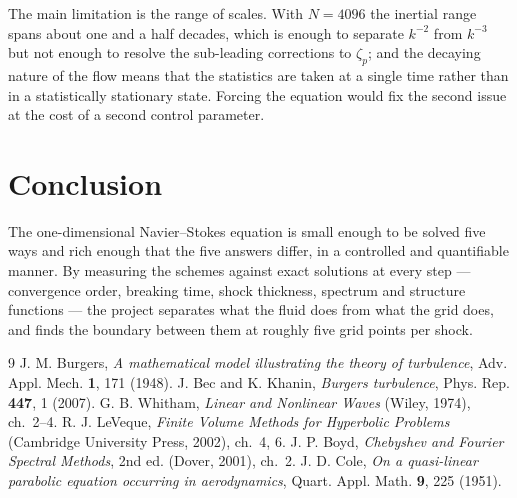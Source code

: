 \documentclass[10pt,a4paper]{article}
\begin{document}
The main limitation is the range of scales. With $N=4096$ the inertial range
spans about one and a half decades, which is enough to separate $k^{-2}$ from
$k^{-3}$ but not enough to resolve the sub-leading corrections to
$\zeta_p$; and the decaying nature of the flow means that the statistics are
taken at a single time rather than in a statistically stationary state. Forcing
the equation would fix the second issue at the cost of a second control
parameter.

\section{Conclusion}

The one-dimensional Navier--Stokes equation is small enough to be solved five
ways and rich enough that the five answers differ, in a controlled and
quantifiable manner. By measuring the schemes against exact solutions at every
step --- convergence order, breaking time, shock thickness, spectrum and
structure functions --- the project separates what the fluid does from what the
grid does, and finds the boundary between them at roughly five grid points per
shock.

\begin{thebibliography}{9}
\setlength{\itemsep}{0pt}
 J. M. Burgers, \emph{A mathematical model illustrating the
theory of turbulence}, Adv. Appl. Mech. \textbf{1}, 171 (1948).
 J. Bec and K. Khanin, \emph{Burgers turbulence},
Phys. Rep. \textbf{447}, 1 (2007).
 G. B. Whitham, \emph{Linear and Nonlinear Waves}
(Wiley, 1974), ch.~2--4.
 R. J. LeVeque, \emph{Finite Volume Methods for Hyperbolic
Problems} (Cambridge University Press, 2002), ch.~4, 6.
 J. P. Boyd, \emph{Chebyshev and Fourier Spectral Methods},
2nd ed. (Dover, 2001), ch.~2.
 J. D. Cole, \emph{On a quasi-linear parabolic equation occurring
in aerodynamics}, Quart. Appl. Math. \textbf{9}, 225 (1951).
\end{thebibliography}
\end{document}
